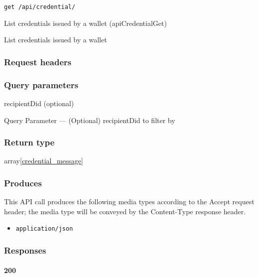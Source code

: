 \protect\hypertarget{apiCredentialGet}{}{}

\begin{verbatim}
get /api/credential/
\end{verbatim}

List credentials issued by a wallet ({apiCredentialGet})

List credentials issued by a wallet

\hypertarget{request-headers-12}{%
\subsubsection{Request headers}\label{request-headers-12}}

\hypertarget{query-parameters}{%
\subsubsection{Query parameters}\label{query-parameters}}

recipientDid (optional)

{Query Parameter} --- (Optional) recipientDid to filter by

\hypertarget{return-type-22}{%
\subsubsection{Return type}\label{return-type-22}}

array{[}\protect\hyperlink{credential_message}{credential\_message}{]}

\hypertarget{produces-28}{%
\subsubsection{Produces}\label{produces-28}}

This API call produces the following media types according to the
{Accept} request header; the media type will be conveyed by the
{Content-Type} response header.

\begin{itemize}
\tightlist
\item
  \texttt{application/json}
\end{itemize}

\hypertarget{responses-28}{%
\subsubsection{Responses}\label{responses-28}}

\hypertarget{section-93}{%
\paragraph{200}\label{section-93}}


